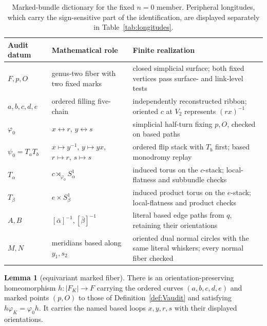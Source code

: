\documentclass[11pt]{article}
\theoremstyle{definition}
\newtheorem{lemma}[theorem]{Lemma}
\begin{document}
\begin{table}[!htbp]
\centering
\small
\renewcommand{\arraystretch}{1.18}
\begin{tabularx}{\textwidth}{@{}>{\raggedright\arraybackslash}p{}
 >{\raggedright\arraybackslash}p{}X@{}}
\toprule
Audit datum & Mathematical role & Finite realization \\
\midrule
$F,p,O$ & genus-two fiber with two fixed marks & closed simplicial surface;
both fixed vertices pass surface- and link-level tests \\
$a,b,c,d,e$ & ordered filling five-chain & independently reconstructed
ribbon; oriented $c$ at $V_2$ represents $(rx)^{-1}$ \\
$\varphi_0$ & $x\leftrightarrow r$, $y\leftrightarrow s$ & simplicial
half-turn fixing $p,O$, checked on based paths \\
$\psi_0=T_aT_b$ & $x\mapsto y^{-1}$, $y\mapsto yx$, $r\mapsto r$,
$s\mapsto s$ & ordered flip stack with $T_b$ first; based monodromy replay \\
$T_\alpha$ & $c\rtimes_{\varphi_0}S^1_\alpha$ & induced torus on the
$c$-stack; local-flatness and subbundle checks \\
$T_\beta$ & $e\times S^1_\beta$ & induced product torus on the $e$-stack;
local-flatness and product checks \\
$A,B$ & $[\bar\alpha]^{-1},[\bar\beta]^{-1}$ & literal based edge paths
from $q$, retaining their orientations \\
$M,N$ & meridians based along $y_1,s_2$ & oriented dual normal circles with
the same literal whiskers; every normal fiber checked \\
\bottomrule
\end{tabularx}
\caption{Marked-bundle dictionary for the fixed $n=0$ member.  Peripheral
longitudes, which carry the sign-sensitive part of the identification, are
displayed separately in Table~\ref{tab:longitudes}.}
\label{tab:dictionary}
\end{table}
\FloatBarrier

\begin{lemma}[equivariant marked fiber]\label{lem:fiber}
There is an orientation-preserving homeomorphism
$h:|F_K|\to F$ carrying the ordered curves $(a,b,c,d,e)$ and marked points
$(p,O)$ to those of Definition~\ref{def:Vaudit} and satisfying
$h\varphi_K=\varphi_0h$.  It carries the named based loops $x,y,r,s$ with
their displayed orientations.
\end{lemma}
\end{document}
